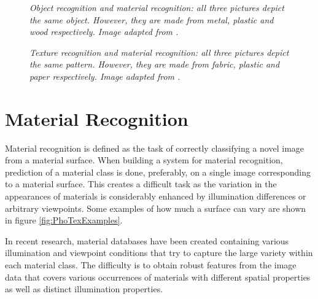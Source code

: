 \begin{figure}[htbp!]
	\begin{center}
	\end{center}
	\caption{{\it Object recognition and material recognition: all three pictures depict the same object. However, they are made from metal, plastic and wood respectively. Image adapted from \cite{ExploringFeatures}.}}
	\label{fig:ObjectRecognition}
\end{figure}

\begin{figure}[htbp!]
	\begin{center}
	\end{center}
	\caption{{\it Texture recognition and material recognition: all three pictures depict the same pattern. However, they are made from fabric, plastic and paper respectively. Image adapted from \cite{ExploringFeatures}.}}
	\label{fig:TextureRecognition}
\end{figure}

\section{Material Recognition}
Material recognition is defined as the task of correctly classifying a novel image from a material surface. When building a system for material recognition, prediction of a material class is done, preferably, on a single image corresponding to a material surface. This creates a difficult task as the variation in the appearances of materials is considerably enhanced by illumination differences or arbitrary viewpoints. Some examples of how much a surface can vary are shown in figure \ref{fig:PhoTexExamples}.

In recent research, material databases have been created containing various illumination and viewpoint conditions that try to capture the large variety within each  material class. The difficulty is to obtain robust features from the image data that covers various occurrences of materials with different spatial properties as well as distinct illumination properties. 


